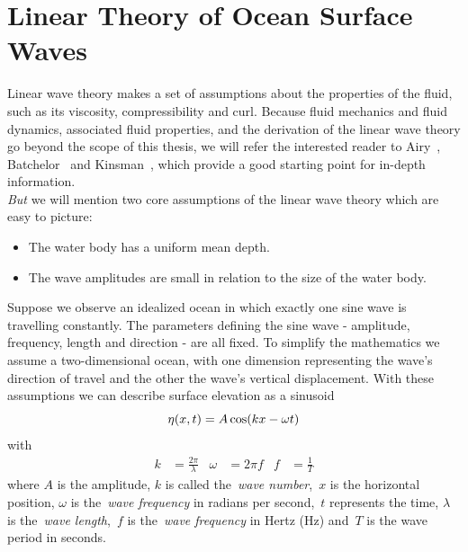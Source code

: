 \section{Linear Theory of Ocean Surface Waves}
\label{sec:linear_theory_ocean_waves}
Linear wave theory makes a set of assumptions about the properties of the fluid, such as its viscosity,
compressibility and curl. Because fluid mechanics and fluid dynamics, associated fluid properties, and the derivation
of the linear wave theory go beyond the scope of this thesis, we will refer the interested reader
to Airy~\cite{book:airy1845tides}, Batchelor~\cite{book:batchelor2000introduction}
and Kinsman~\cite{book:kinsman2002wind}, which provide a good starting point for in-depth information.\\

\emph{But} we will mention two core assumptions of the linear wave theory which are easy to picture:
\begin{itemize}
 \item The water body has a uniform mean depth.
 \item The wave amplitudes are small in relation to the size of the water body.
\end{itemize}
Suppose we observe an idealized ocean in which exactly one sine wave is travelling constantly.
The parameters defining the sine wave - amplitude, frequency, length and direction - are all fixed.
To simplify the mathematics we assume a two-dimensional ocean, with one
dimension representing the wave's direction of travel and the  other the wave's
vertical displacement. With these assumptions we can describe surface elevation
as a sinusoid
%
\begin{equation}
\label{eq:sinusoid}
 \eta(x, t) = A\cos(kx - \omega t)\\
\end{equation}
with
\begin{align}
\label{eq:sinusoid_parameters}
 k &= \frac{2\pi}{\lambda} & \omega &= 2\pi f & f &= \frac{1}{T}
\end{align}
%
where $A$ is the amplitude, $k$ is called the~\emph{wave number},~$x$ is the horizontal position,
$\omega$ is the~\emph{wave frequency} in radians per second,~$t$ represents the time,
$\lambda$ is the~\emph{wave length},~$f$ is the~\emph{wave frequency} in Hertz (Hz) and~$T$
is the wave period in seconds.\\

